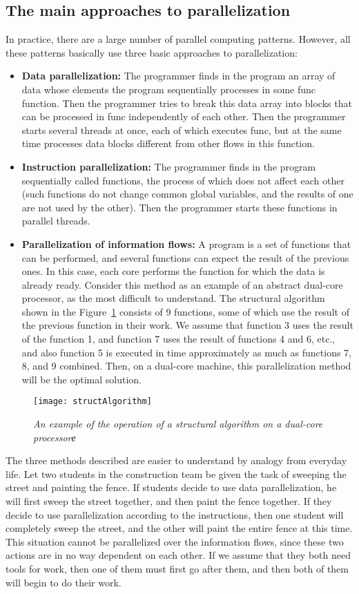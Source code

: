 { %
	\subsection{The main approaches to parallelization}
	\par In practice, there are a large number of parallel computing patterns. However, all these patterns basically use three basic approaches to parallelization:
	\begin{itemize}
		\item\textbf{Data parallelization:} The programmer finds in the program an array of data whose elements the program sequentially processes in some func function. Then the programmer tries to break this data array into blocks that can be processed in func independently of each other. Then the programmer starts several threads at once, each of which executes func, but at the same time processes data blocks different from other flows in this function.
		\item\textbf{Instruction parallelization:} The programmer finds in the program sequentially called functions, the process of which does not affect each other (such functions do not change common global variables, and the results of one are not used by the other). Then the programmer starts these functions in parallel threads.
		\item\textbf{Parallelization of information flows:} A program is a set of functions that can be performed, and several functions can expect the result of the previous ones. In this case, each core performs the function for which the data is already ready. Consider this method as an example of an abstract dual-core processor, as the most difficult to understand. The structural algorithm shown in the Figure~\ref{structAlgorithm:image} consists of 9 functions, some of which use the result of the previous function in their work. We assume that function 3 uses the result of the function 1, and function 7 uses the result of functions 4 and 6, etc., and also function 5 is executed in time approximately as much as functions 7, 8, and 9 combined. Then, on a dual-core machine, this parallelization method will be the optimal solution.
	\end{itemize}
	\begin{figure}[H]
		\texttt{[image: structAlgorithm]}
		\caption{\textit{An example of the operation of a structural algorithm on a dual-core processorе}}
		\label{structAlgorithm:image}
	\end{figure}
	\par The three methods described are easier to understand by analogy from everyday life. Let two students in the construction team be given the task of sweeping the street and painting the fence. If students decide to use data parallelization, he will first sweep the street together, and then paint the fence together. If they decide to use parallelization according to the instructions, then one student will completely sweep the street, and the other will paint the entire fence at this time. This situation cannot be parallelized over the information flows, since these two actions are in no way dependent on each other. If we assume that they both need tools for work, then one of them must first go after them, and then both of them will begin to do their work.
}
